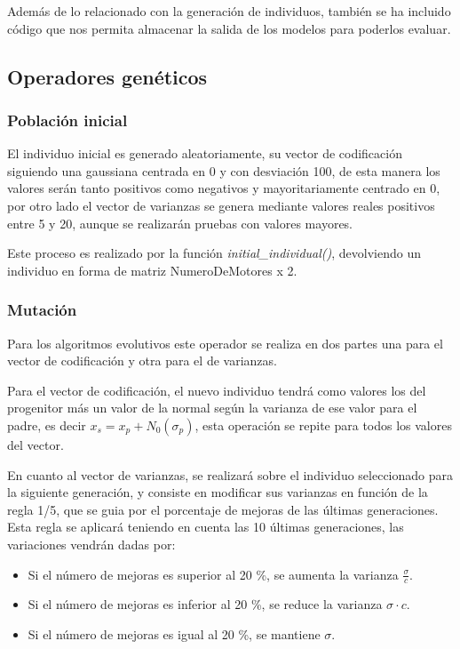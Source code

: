 \documentclass[12pt, spanish, pdftex]{UC3M_document}
\begin{document}
Además de lo relacionado con la generación de individuos, también se ha incluido código que nos permita almacenar la salida de los modelos para poderlos evaluar.

\subsection{Operadores genéticos}
\subsubsection{Población inicial}
El individuo inicial es generado aleatoriamente, su vector de codificación siguiendo una gaussiana centrada en 0 y con desviación 100, de esta manera los valores serán tanto positivos como negativos y mayoritariamente centrado en 0, por otro lado el vector de varianzas se genera mediante valores reales positivos entre 5 y 20, aunque se realizarán pruebas con valores mayores.

Este proceso es realizado por la función \textit{initial\_individual()}, devolviendo un individuo en forma de matriz NumeroDeMotores x 2.  

\subsubsection{Mutación}
Para los algoritmos evolutivos este operador se realiza en dos partes una para el vector de codificación y otra para el de varianzas.

Para el vector de codificación, el nuevo individuo tendrá como valores los del progenitor más un valor de la normal según la varianza de ese valor para el padre, es decir $x_s=x_p+N_0(\sigma_p)$, esta operación se repite para todos los valores del vector.

En cuanto al vector de varianzas, se realizará sobre el individuo seleccionado para la siguiente generación, y consiste en modificar sus varianzas en función de la regla 1/5, que se guia por el porcentaje de mejoras de las últimas generaciones. Esta regla se aplicará teniendo en cuenta las 10 últimas generaciones, las variaciones vendrán dadas por:
\begin{itemize}
	\item Si el número de mejoras es superior al 20 \%, se aumenta la varianza $\frac \sigma c$.
	\item Si el número de mejoras es inferior al 20 \%, se reduce la varianza $\sigma \cdot c$.
	\item Si el número de mejoras es igual al 20 \%, se mantiene $\sigma$.
\end{itemize}
\end{document}
